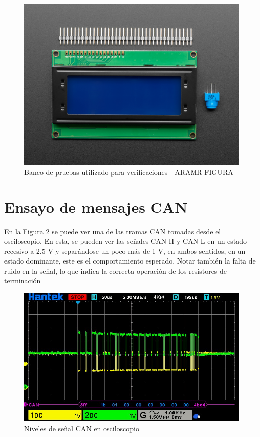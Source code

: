 \begin{figure}[htbp]
	\centering
	\includegraphics[scale=1]{./Figures/LCD.jpg}
	\caption{Banco de pruebas utilizado para verificaciones - ARAMR FIGURA}
	\label{fig:Banco}
\end{figure}



\section{Ensayo de mensajes CAN}

En la Figura \ref{fig:niv_señal} se puede ver una de las tramas CAN tomadas desde el osciloscopio. En esta, se pueden ver las señales CAN-H y CAN-L en un estado recesivo a 2.5 V y separándose un poco más de 1 V, en ambos sentidos, en un estado dominante, este es el comportamiento esperado. Notar también la falta de ruido en la señal, lo que indica la correcta operación de los resistores de terminación

\begin{figure}[htbp]
	\centering
	\includegraphics[scale=0.6]{./Figures/Message_Change_Operation_Mode_CONFIG.jpg}
	\caption{Niveles de señal CAN en osciloscopio}
	\label{fig:niv_señal}
\end{figure}

